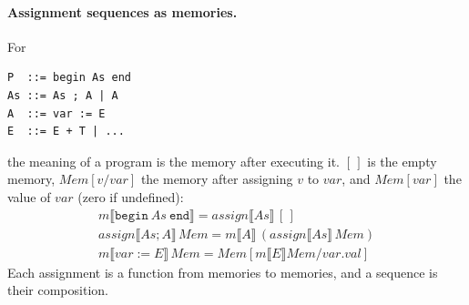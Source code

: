 \paragraph{Assignment sequences as memories.} For
\begin{lstlisting}
P  ::= begin As end
As ::= As ; A | A
A  ::= var := E
E  ::= E + T | ...
\end{lstlisting}
the meaning of a program is the memory after executing it. $[\,]$ is the empty
memory, $\mathit{Mem}[v/\mathit{var}]$ the memory after assigning $v$ to $\mathit{var}$, and
$\mathit{Mem}[\mathit{var}]$ the value of $\mathit{var}$ (zero if undefined):
\[
\begin{array}{l}
m\llbracket \mathtt{begin}\ As\ \mathtt{end} \rrbracket = \mathit{assign}\llbracket As \rrbracket\, [\,] \\
\mathit{assign}\llbracket As ; A \rrbracket\, \mathit{Mem} = m\llbracket A \rrbracket\, (\mathit{assign}\llbracket As \rrbracket\, \mathit{Mem}) \\
m\llbracket \mathit{var} := E \rrbracket\, \mathit{Mem} = \mathit{Mem}[m\llbracket E \rrbracket \mathit{Mem} / \mathit{var.val}]
\end{array}
\]
Each assignment is a function from memories to memories, and a sequence is
their composition.

